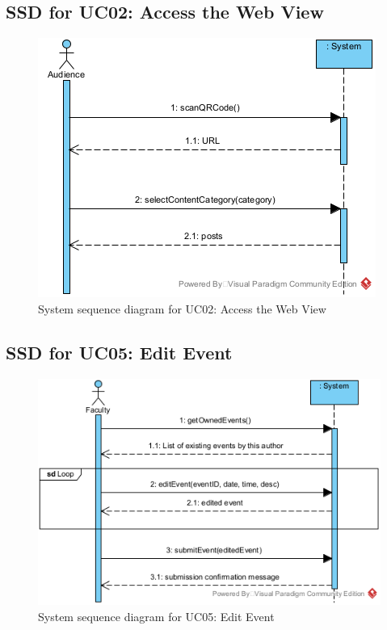\documentclass{article}
\begin{document}
\subsection{SSD for UC02: Access the Web View}
\begin{figure}[H]
    \centering
    \includegraphics[scale=1.0]{SSD - UC02 - View All Posts.png}
    \caption{System sequence diagram for UC02: Access the Web View}
    \label{fig:enter-label}
\end{figure}
\subsection{SSD for UC05: Edit Event}
\begin{figure}[H]
    \centering
    \includegraphics[scale=1.0]{images/SSD - UC05 - Edit Event.png}
    \caption{System sequence diagram for UC05: Edit Event}
    \label{fig:enter-label}
\end{figure}
\end{document}

